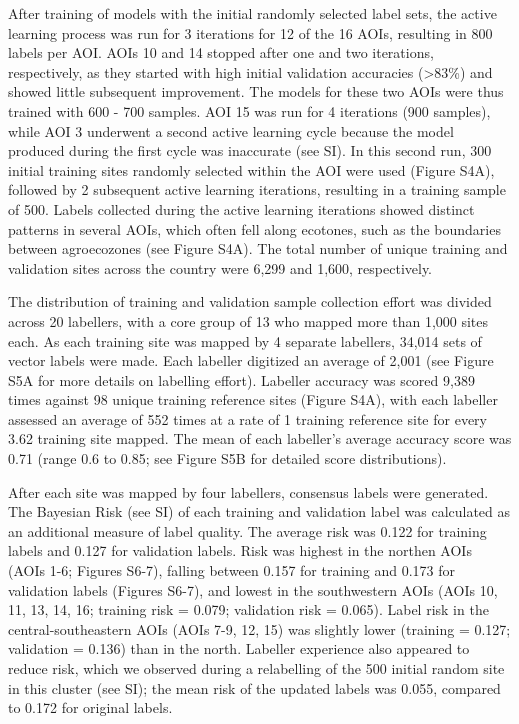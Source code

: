 \documentclass[11pt,a4paper]{article}
\begin{document}
After training of models with the initial randomly selected label sets,
the active learning process was run for 3 iterations for 12 of the 16
AOIs, resulting in 800 labels per AOI. AOIs 10 and 14 stopped after one
and two iterations, respectively, as they started with high initial
validation accuracies (\textgreater83\%) and showed little subsequent
improvement. The models for these two AOIs were thus trained with 600 -
700 samples. AOI 15 was run for 4 iterations (900 samples), while AOI 3
underwent a second active learning cycle because the model produced
during the first cycle was inaccurate (see SI). In this second run, 300
initial training sites randomly selected within the AOI were used
(Figure S4A), followed by 2 subsequent active learning iterations,
resulting in a training sample of 500. Labels collected during the
active learning iterations showed distinct patterns in several AOIs,
which often fell along ecotones, such as the boundaries between
agroecozones (see Figure S4A). The total number of unique training and
validation sites across the country were 6,299 and 1,600, respectively.

The distribution of training and validation sample collection effort was
divided across 20 labellers, with a core group of 13 who mapped more
than 1,000 sites each. As each training site was mapped by 4 separate
labellers, 34,014 sets of vector labels were made. Each labeller
digitized an average of 2,001 (see Figure S5A for more details on
labelling effort). Labeller accuracy was scored 9,389 times against 98
unique training reference sites (Figure S4A), with each labeller
assessed an average of 552 times at a rate of 1 training reference site
for every 3.62 training site mapped. The mean of each labeller's average
accuracy score was 0.71 (range 0.6 to 0.85; see Figure S5B for detailed
score distributions).

After each site was mapped by four labellers, consensus labels were
generated. The Bayesian Risk (see SI) of each training and validation
label was calculated as an additional measure of label quality. The
average risk was 0.122 for training labels and 0.127 for validation
labels. Risk was highest in the northen AOIs (AOIs 1-6; Figures S6-7),
falling between 0.157 for training and 0.173 for validation labels
(Figures S6-7), and lowest in the southwestern AOIs (AOIs 10, 11, 13,
14, 16; training risk = 0.079; validation risk = 0.065). Label risk in
the central-southeastern AOIs (AOIs 7-9, 12, 15) was slightly lower
(training = 0.127; validation = 0.136) than in the north. Labeller
experience also appeared to reduce risk, which we observed during a
relabelling of the 500 initial random site in this cluster (see SI); the
mean risk of the updated labels was 0.055, compared to 0.172 for
original labels.
\end{document}
